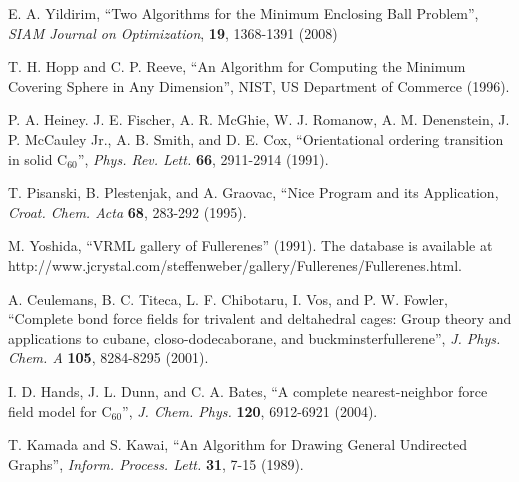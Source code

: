 \documentclass[article,a4paper,twoside]{memoir}
\newcommand{\C}[1]{\ensuremath{\mathrm{C}_{#1}}}
\begin{document}
\begin{thebibliography}{99}
 E. A. Yildirim, ``Two Algorithms for the Minimum Enclosing Ball Problem'', 
\textit{SIAM Journal on Optimization}, \textbf{19}, 1368-1391 (2008) 

 T. H. Hopp and C. P. Reeve, ``An Algorithm for Computing the Minimum Covering Sphere in Any Dimension'', 
NIST, US Department of Commerce (1996).

 P. A. Heiney. J. E. Fischer, A. R. McGhie, W. J. Romanow, A. M. Denenstein, J. P. McCauley Jr., A. B. Smith, and D. E. Cox,
``Orientational ordering transition in solid \C{60}'', \textit{Phys. Rev. Lett.} \textbf{66}, 2911-2914 (1991).

 T. Pisanski, B. Plestenjak, and A. Graovac, ``Nice Program and its Application, \textit{Croat. Chem. Acta} \textbf{68}, 283-292 (1995).

 M. Yoshida, ``VRML gallery of Fullerenes'' (1991). The database is available at http://www.jcrystal.com/steffenweber/gallery/Fullerenes/Fullerenes.html.

 A. Ceulemans, B. C. Titeca, L. F. Chibotaru, I. Vos, and P. W. Fowler, ``Complete bond force fields for trivalent and deltahedral cages: Group theory and applications to cubane, closo-dodecaborane, and buckminsterfullerene'', \textit{J. Phys. Chem. A} \textbf{105}, 8284-8295 (2001).

 I. D. Hands, J. L. Dunn, and C. A. Bates, ``A complete nearest-neighbor force field model for \C{60}'', 
\textit{J. Chem. Phys.} \textbf{120}, 6912-6921 (2004).

 T. Kamada and S. Kawai, ``An Algorithm for Drawing General Undirected Graphs'', \textit{Inform. Process. Lett.} \textbf{31}, 7-15 (1989).

\end{thebibliography}
\end{document}
